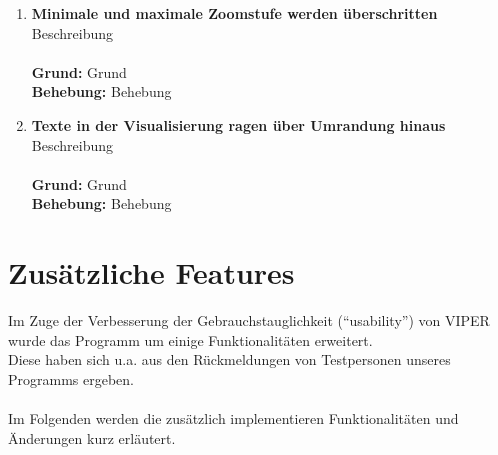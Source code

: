 \documentclass[parskip=full,11pt,twoside]{scrartcl}
\begin{document}
\begin{enumerate}[label=\#\arabic*]
  \item \textbf{Minimale und maximale Zoomstufe werden überschritten}\\
        Beschreibung\\\\
        \textbf{Grund:} Grund\\
        \textbf{Behebung:} Behebung

  \item \textbf{Texte in der Visualisierung ragen über Umrandung hinaus}\\
        Beschreibung\\\\
        \textbf{Grund:} Grund\\
        \textbf{Behebung:} Behebung
\end{enumerate}

\section{Zusätzliche Features}

Im Zuge der Verbesserung der Gebrauchstauglichkeit (\enquote{usability}) von VIPER wurde das Programm um einige Funktionalitäten erweitert.\\
Diese haben sich u.a. aus den Rückmeldungen von Testpersonen unseres Programms ergeben.\\\\
Im Folgenden werden die zusätzlich implementieren Funktionalitäten und Änderungen kurz erläutert.
\end{document}
